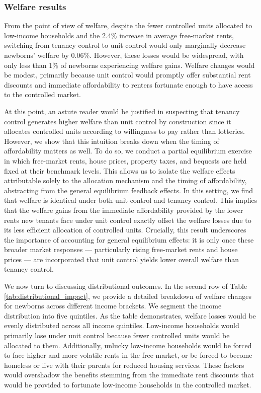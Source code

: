\documentclass[parskip=full]{article}
\begin{document}
\subsubsection{Welfare results}

From the point of view of welfare, despite the fewer controlled units allocated to low-income households and the 2.4\% increase in average free-market rents, switching from tenancy control to unit control would only marginally decrease newborns' welfare by 0.06\%. However, these losses would be widespread, with only less than 1\% of newborns experiencing welfare gains. Welfare changes would be modest, primarily because unit control would promptly offer substantial rent discounts and immediate affordability to renters fortunate enough to have access to the controlled market.

At this point, an astute reader would be justified in suspecting that tenancy control generates higher welfare than unit control by construction since it allocates controlled units according to willingness to pay rather than lotteries. However, we show that this intuition breaks down when the timing of affordability matters as well. To do so, we conduct a partial equilibrium exercise in which free-market rents, house prices, property taxes, and bequests are held fixed at their benchmark levels. This allows us to isolate the welfare effects attributable solely to the allocation mechanism and the timing of affordability, abstracting from the general equilibrium feedback effects. In this setting, we find that welfare is identical under both unit control and tenancy control. This implies that the welfare gains from the immediate affordability provided by the lower rents new tenants face under unit control exactly offset the welfare losses due to its less efficient allocation of controlled units. Crucially, this result underscores the importance of accounting for general equilibrium effects: it is only once these broader market responses — particularly rising free-market rents and house prices — are incorporated that unit control yields lower overall welfare than tenancy control.

We now turn to discussing distributional outcomes. In the second row of Table \ref{tab:distributional_impact}, we provide a detailed breakdown of welfare changes for newborns across different income brackets. We segment the income distribution into five quintiles. As the table demonstrates, welfare losses would be evenly distributed across all income quintiles. Low-income households would primarily lose under unit control because fewer controlled units would be allocated to them. Additionally, unlucky low-income households would be forced to face higher and more volatile rents in the free market, or be forced to become homeless or live with their parents for reduced housing services. These factors would overshadow the benefits stemming from the immediate rent discounts that would be provided to fortunate low-income households in the controlled market. 
\end{document}
